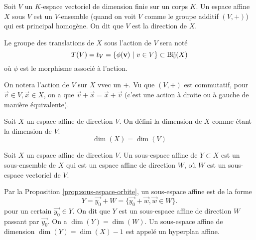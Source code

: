 \begin{definition}
	Soit $V$ un $K$-espace vectoriel de dimension finie sur un corps $K$. Un
	espace affine $X$ sous $V$ est un $V$-ensemble (quand on voit $V$ comme le
	groupe additif $(V, +)$) qui est principal homogène. On dit que $V$ est la
	direction de $X$. 
\end{definition}

\begin{notation}
	Le groupe des translations de $X$ sous l'action de $V$ sera noté
	\begin{equation*}
		T(V) = t_V = \{\phi(\vec{v})\ |\ v \in V\} \subset \Bij(X)
	\end{equation*}
	où $\phi$ est le morphisme associé à l'action.
\end{notation}

\begin{notation}
	On notera l'action de $V$ sur $X$ vvec un $+$. Vu que $(V, +)$ est
	commutatif, pour $\vec{v} \in V, \vec{x} \in X$, on a que
	$\vec{v} + \vec{x} = \vec{x} + \vec{v}$ (c'est une action à droite ou à
	gauche de manière équivalente).
\end{notation}

\begin{definition}
	Soit $X$ un espace affine de direction $V$. On défini la dimension de $X$
	comme étant la dimension de $V$:
	\begin{equation*}
		\dim(X) = \dim(V)
	\end{equation*}
\end{definition}

\begin{definition}
	Soit $X$ un espace affine de direction $V$. Un sous-espace affine de $Y
	\subset X$ est un sous-ensemble de $X$ qui est un espace affine de direction
	$W$, où $W$ est un sous-espace vectoriel de $V$.
\end{definition}

\begin{remark}
	Par la Proposition \ref{prop:sous-espace-orbite}, un sous-espace affine est
	de la forme
	\begin{equation*}
		Y = \vec{y_0} + W = \{\vec{y_0} + \vec{w}, \vec{w} \in W\}.
	\end{equation*}
	pour un certain $\vec{y_0} \in Y$. On dit que $Y$ est un sous-espace affine
	de direction $W$ passant par $\vec{y_0}$. On a $\dim(Y) = \dim(W)$. Un
	sous-espace affine de dimension $\dim(Y) = \dim(X) - 1$ est appelé un
	hyperplan affine.
\end{remark}

